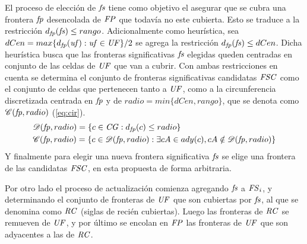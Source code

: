 El proceso de elección de $\mathit{fs}$ tiene como objetivo el asegurar que se
cubra una frontera $\mathit{fp}$ desencolada de $\mathit{FP}$ que todavía no este
cubierta. Esto se traduce a la restricción $d_{\mathit{fp}}(\mathit{fs}) \leq rango$.
Adicionalmente como heurística, sea $dCen = max\{ d_{\mathit{fp}}(\mathit{\mathit{uf}}) :
\mathit{uf}\in\mathit{UF} \}/2$ se agrega la restricción $d_{\mathit{fp}}(\mathit{fs}) \leq dCen$.
Dicha heurística busca que las fronteras significativas $\mathit{fs}$ elegidas queden
centradas en conjunto de las celdas de $\mathit{UF}$ que van a cubrir. Con ambas
restricciones en cuenta se determina el conjunto de fronteras significativas
candidatas $\mathit{FSC}$ como el conjunto de celdas que pertenecen tanto a $\mathit{UF}$, como 
a la circunferencia discretizada centrada en $\mathit{fp}$ y de $radio = min
\{dCen, rango\}$, que se denota como $\mathscr{C}(\mathit{fp},radio)$
(\ref{eq:cir}).
\begin{equation} \label{eq:cir}
\begin{aligned}
&\mathscr{D}(\mathit{fp},radio) = \{c\in\mathit{CG} : d_{\mathit{fp}}(c) \leq radio\}\\ 
&\mathscr{C}(\mathit{fp},radio) = \{c\in\mathscr{D}(\mathit{fp},radio) : \exists cA \in ady(c), cA \notin \mathscr{D}(\mathit{fp},radio) \}
\end{aligned}
\end{equation}
Y finalmente para elegir una nueva frontera significativa $\mathit{fs}$ se elige una
frontera de las candidatas $\mathit{FSC}$, en esta propuesta de forma arbitraria.

Por otro lado el proceso de actualización comienza agregando $\mathit{fs}$ a
$\mathit{FS}_i$, y determinando el conjunto de fronteras de $\mathit{UF}$ que son
cubiertas por $\mathit{fs}$, al que se denomina como $\mathit{RC}$ (siglas de recién
cubiertas). Luego las fronteras de $\mathit{RC}$ se remueven de $\mathit{UF}$, y por
último se encolan en $\mathit{FP}$ las fronteras de $\mathit{UF}$ que son adyacentes
a las de $\mathit{RC}$.



